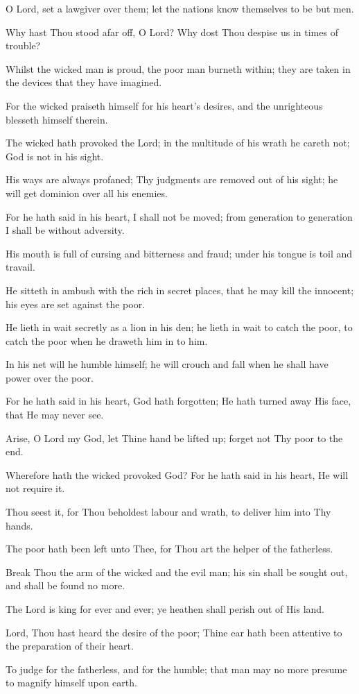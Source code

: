 O Lord, set a lawgiver over them; let the nations know themselves to be but men.

Why hast Thou stood afar off, O Lord? Why dost Thou despise us in times of trouble?

Whilst the wicked man is proud, the poor man burneth within; they are taken in the devices that they have imagined.

For the wicked praiseth himself for his heart’s desires, and the unrighteous blesseth himself therein.

The wicked hath provoked the Lord; in the multitude of his wrath he careth not; God is not in his sight.

His ways are always profaned; Thy judgments are removed out of his sight; he will get dominion over all his enemies.

For he hath said in his heart, I shall not be moved; from generation to generation I shall be without adversity.

His mouth is full of cursing and bitterness and fraud; under his tongue is toil and travail.

He sitteth in ambush with the rich in secret places, that he may kill the innocent; his eyes are set against the poor.

He lieth in wait secretly as a lion in his den; he lieth in wait to catch the poor, to catch the poor when he draweth him in to him.

In his net will he humble himself; he will crouch and fall when he shall have power over the poor.

For he hath said in his heart, God hath forgotten; He hath turned away His face, that He may never see.

Arise, O Lord my God, let Thine hand be lifted up; forget not Thy poor to the end.

Wherefore hath the wicked provoked God? For he hath said in his heart, He will not require it.

Thou seest it, for Thou beholdest labour and wrath, to deliver him into Thy hands.

The poor hath been left unto Thee, for Thou art the helper of the fatherless.

Break Thou the arm of the wicked and the evil man; his sin shall be sought out, and shall be found no more.

The Lord is king for ever and ever; ye heathen shall perish out of His land.

Lord, Thou hast heard the desire of the poor; Thine ear hath been attentive to the preparation of their heart.

To judge for the fatherless, and for the humble; that man may no more presume to magnify himself upon earth.
